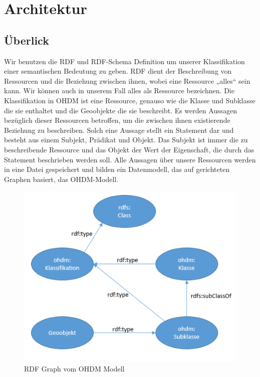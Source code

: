 \section{Architektur}

\subsection{Überlick}

Wir benutzen die RDF und RDF-Schema Definition um unserer Klassifikation einer semantischen Bedeutung zu geben. RDF dient der Beschreibung von Ressourcen und die Beziehung zwischen ihnen, wobei eine Ressource „alles“ sein kann.\newline
Wir können auch in unserem Fall alles als Ressource bezeichnen. Die Klassifikation in OHDM ist eine Ressource, genauso wie die Klasse und Subklasse die sie enthaltet und die Geoobjekte die sie beschreibt. Es werden Aussagen bezüglich dieser Ressourcen betroffen, um die zwischen ihnen existierende Beziehung zu beschreiben. Solch eine Aussage stellt ein Statement dar und besteht aus einem Subjekt, Prädikat und Objekt. Das Subjekt ist immer die zu beschreibende Ressource und das Objekt der Wert der Eigenschaft, die durch das Statement beschrieben werden soll. Alle Aussagen über unsere Ressourcen werden in eine Datei gespeichert und bilden ein Datenmodell, das auf gerichteten Graphen basiert, das OHDM-Modell.

\begin{figure}
	\centering
		\includegraphics{sparql/ohdm-rdf.PNG}
	\caption{RDF Graph vom OHDM Modell}
	\label{fig:ohdm-rdf}
\end{figure}

